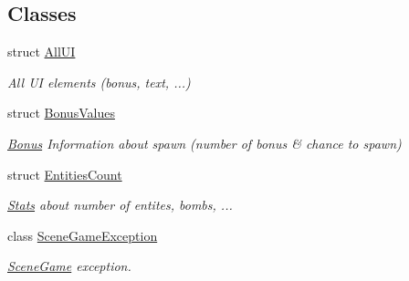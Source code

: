 \subsection*{Classes}
\begin{DoxyCompactItemize}
\item 
struct \hyperlink{struct_scene_game_1_1_all_u_i}{All\+UI}
\begin{DoxyCompactList}\small\item\em All UI elements (bonus, text, ...) \end{DoxyCompactList}\item 
struct \hyperlink{struct_scene_game_1_1_bonus_values}{Bonus\+Values}
\begin{DoxyCompactList}\small\item\em \hyperlink{class_bonus}{Bonus} Information about spawn (number of bonus \& chance to spawn) \end{DoxyCompactList}\item 
struct \hyperlink{struct_scene_game_1_1_entities_count}{Entities\+Count}
\begin{DoxyCompactList}\small\item\em \hyperlink{class_stats}{Stats} about number of entites, bombs, ... \end{DoxyCompactList}\item 
class \hyperlink{class_scene_game_1_1_scene_game_exception}{Scene\+Game\+Exception}
\begin{DoxyCompactList}\small\item\em \hyperlink{class_scene_game}{Scene\+Game} exception. \end{DoxyCompactList}\end{DoxyCompactItemize}
